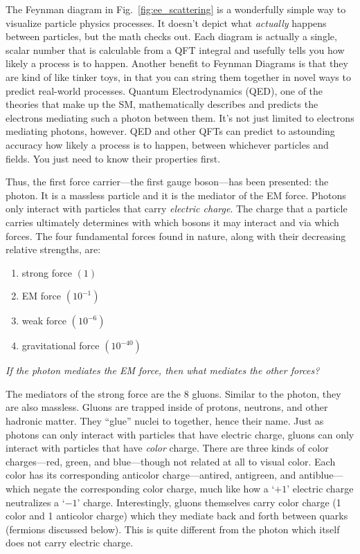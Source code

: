 The Feynman diagram in Fig.~\ref{fig:ee_scattering} is a wonderfully simple way to visualize particle physics processes.
It doesn't depict what \emph{actually} happens between particles, but the math checks out.
Each diagram is actually a single, scalar number that is calculable from a QFT integral and usefully tells you how likely a process is to happen.
Another benefit to Feynman Diagrams is that they are kind of like tinker toys, 
in that you can string them together in novel ways to predict real-world processes.
Quantum Electrodynamics (QED), one of the theories that make up the SM, mathematically describes and predicts the electrons mediating such a photon between them. 
It's not just limited to electrons mediating photons, however.
QED and other QFTs can predict to astounding accuracy how likely a process is to happen, between whichever particles and fields. 
You just need to know their properties first.

Thus, the first force carrier---the first gauge boson---has been presented: the photon.
It is a massless particle and it is the mediator of the EM force. 
Photons only interact with particles that carry \emph{electric charge}.
The charge that a particle carries ultimately determines with which bosons it may interact and via which forces.
The four fundamental forces found in nature, along with their decreasing relative strengths, are: 
\begin{enumerate}
    \item strong force $(1)$
    \item EM force $(10^{-1})$
    \item weak force $(10^{-6})$
    \item gravitational force $(10^{-40})$
\end{enumerate}
\emph{If the photon mediates the EM force, then what mediates the other forces?}

The mediators of the strong force are the 8 gluons. 
Similar to the photon, they are also massless.
Gluons are trapped inside of protons, neutrons, and other hadronic matter. 
They ``glue'' nuclei to together, hence their name.
Just as photons can only interact with particles that have electric charge, gluons can only interact with particles that have \emph{color} charge.
There are three kinds of color charges---red, green, and blue---though not related at all to visual color.
Each color has its corresponding anticolor charge---antired, antigreen, and antiblue---which negate the corresponding color charge, much like how a `$+1$' electric charge neutralizes a `$-1$' charge.
Interestingly, gluons themselves carry color charge (1 color and 1 anticolor charge) which they mediate back and forth between quarks (fermions discussed below).  %
This is quite different from the photon which itself does not carry electric charge.

